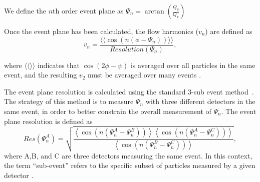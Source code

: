 We define the $n$th order event plane as
$\Psi_n = \arctan \left( \frac{Q_y}{Q_x} \right) $

Once the event plane has been calculated, the flow harmonics ($v_n$) are defined as
\begin{equation}
v_n = \frac{\langle \langle\cos(n(\phi - \Psi_n))\rangle \rangle}{Resolution(\Psi_n)},
\end{equation}

where $\langle \langle \rangle \rangle$ indicates that $\cos(2\phi-\psi)$ is averaged over all particles in the same event, and the resulting $v_2$ must be averaged over many events \cite{PhysRevC.58.1671}. 

The event plane resolution is calculated using the standard 3-sub event method~\cite{PhysRevC.58.1671}. The strategy of this method is to measure $\Psi_n$ with three
different detectors in the same event, in order to better constrain the overall measurement of $\Psi_n$. The event plane resolution is defined as
\begin{equation}
Res(\Psi_n^A) = \sqrt{\frac{\left<\cos(n(\Psi_n^A - \Psi_n^B))\right>\left<\cos(n(\Psi_n^A - \Psi_n^C))\right>}{\left<\cos(n(\Psi_n^B - \Psi_n^C))\right>}},
\label{eqn:res}
\end{equation}
where A,B, and C are three detectors measuring the same event. In this context, the term ``sub-event'' refers to the specific subset of particles measured by a given detector \cite{PhysRevC.58.1671}.




